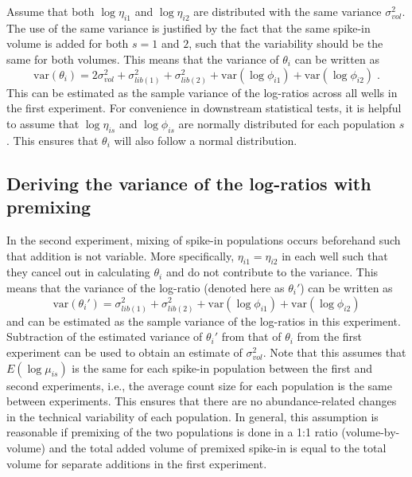 \documentclass{article}
\begin{document}
Assume that both $\log \eta_{i1}$ and $\log \eta_{i2}$ are distributed with the same variance $\sigma^2_{vol}$.
The use of the same variance is justified by the fact that the same spike-in volume is added for both $s=1$ and $2$, such that the variability should be the same for both volumes.
This means that the variance of $\theta_i$ can be written as
\[
    \mbox{var}(\theta_i) = 2\sigma_{vol}^2 + \sigma^2_{lib(1)} + \sigma^2_{lib(2)} + \mbox{var}(\log \phi_{i1}) +  \mbox{var}(\log \phi_{i2}) \;. 
\]
This can be estimated as the sample variance of the log-ratios across all wells in the first experiment. 
For convenience in downstream statistical tests, it is helpful to assume that $\log \eta_{is}$ and $\log \phi_{is}$ are normally distributed for each population $s$.
This ensures that $\theta_i$ will also follow a normal distribution.

\subsection{Deriving the variance of the log-ratios with premixing}
In the second experiment, mixing of spike-in populations occurs beforehand such that addition is not variable.
More specifically, $\eta_{i1}=\eta_{i2}$ in each well such that they cancel out in calculating $\theta_i$ and do not contribute to the variance.
This means that the variance of the log-ratio (denoted here as $\theta_i'$) can be written as
\[
    \mbox{var}(\theta_i') = \sigma^2_{lib(1)} + \sigma^2_{lib(2)} + \mbox{var}(\log \phi_{i1}) +  \mbox{var}(\log \phi_{i2})
\]
and can be estimated as the sample variance of the log-ratios in this experiment.
Subtraction of the estimated variance of $\theta_i'$ from that of $\theta_i$ from the first experiment can be used to obtain an estimate of $\sigma^2_{vol}$.
Note that this assumes that $E(\log \mu_{is})$ is the same for each spike-in population between the first and second experiments, i.e., the average count size for each population is the same between experiments.
This ensures that there are no abundance-related changes in the technical variability of each population.
In general, this assumption is reasonable if premixing of the two populations is done in a 1:1 ratio (volume-by-volume) and the total added volume of premixed spike-in is equal to the total volume for separate additions in the first experiment.
\end{document}
